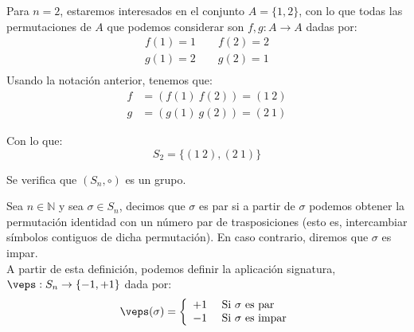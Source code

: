 \begin{ejemplo}
    Para $n=2$, estaremos interesados en el conjunto $A=\{1,2\}$, con lo que todas las permutaciones de $A$ que podemos considerar son $f,g:A\rightarrow A$ dadas por:
    \begin{gather*}
        f(1) = 1 \qquad f(2) = 2 \\
        g(1) = 2 \qquad g(2) = 1 \\
    \end{gather*}
    Usando la notación anterior, tenemos que:
    \begin{align*}
        f &= (f(1)\ f(2)) = (1\ 2) \\
        g &= (g(1)\ g(2)) = (2\ 1)
    \end{align*}

    Con lo que:
    \begin{equation*}
        S_2 = \{(1\ 2),(2\ 1)\}
    \end{equation*}
\end{ejemplo}

\begin{prop}
    Se verifica que $(S_n,\circ)$ es un grupo.
\end{prop}

\begin{definicion}[Signatura]
    Sea $n\in \mathbb{N}$ y sea $\sigma\in S_n$, decimos que $\sigma$ es par si a partir de $\sigma$ podemos obtener la permutación identidad con un número par de trasposiciones (esto es, intercambiar símbolos contiguos de dicha permutación). En caso contrario, diremos que $\sigma$ es impar.\\

    \noindent
    A partir de esta definición, podemos definir la aplicación signatura, ${\veps:S_n\rightarrow\{-1,+1\}}$ dada por:
    \begin{equation*}
        \veps(\sigma) = \left\{\begin{array}{rl}
                +1 & \text{\ Si\ } \sigma \text{\ es par} \\
                -1 & \text{\ Si\ } \sigma \text{\ es impar} \\
        \end{array}\right.
    \end{equation*}
\end{definicion}

